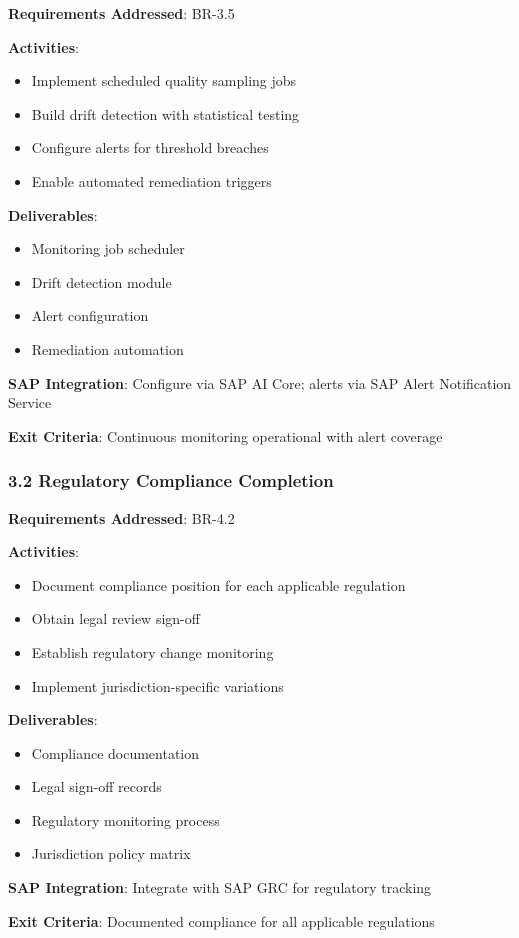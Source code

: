 \begin{tcolorbox}[colback=orange!5,colframe=orange!70,title=3.1 Quality Monitoring]
\textbf{Requirements Addressed}: BR-3.5

\textbf{Activities}:
\begin{itemize}
  \item Implement scheduled quality sampling jobs
  \item Build drift detection with statistical testing
  \item Configure alerts for threshold breaches
  \item Enable automated remediation triggers
\end{itemize}

\textbf{Deliverables}:
\begin{itemize}
  \item Monitoring job scheduler
  \item Drift detection module
  \item Alert configuration
  \item Remediation automation
\end{itemize}

\textbf{SAP Integration}: Configure via SAP AI Core; alerts via SAP Alert
Notification Service

\textbf{Exit Criteria}: Continuous monitoring operational with alert coverage
\end{tcolorbox}

\subsubsection{3.2 Regulatory Compliance Completion}

\begin{tcolorbox}[colback=orange!5,colframe=orange!70,title=3.2 Compliance Framework]
\textbf{Requirements Addressed}: BR-4.2

\textbf{Activities}:
\begin{itemize}
  \item Document compliance position for each applicable regulation
  \item Obtain legal review sign-off
  \item Establish regulatory change monitoring
  \item Implement jurisdiction-specific variations
\end{itemize}

\textbf{Deliverables}:
\begin{itemize}
  \item Compliance documentation
  \item Legal sign-off records
  \item Regulatory monitoring process
  \item Jurisdiction policy matrix
\end{itemize}

\textbf{SAP Integration}: Integrate with SAP GRC for regulatory tracking

\textbf{Exit Criteria}: Documented compliance for all applicable regulations
\end{tcolorbox}

